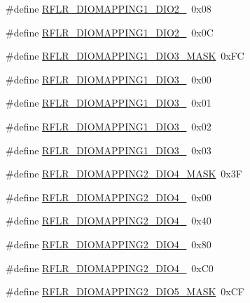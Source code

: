 \begin{DoxyCompactItemize}
\item 
\#define \mbox{\hyperlink{sx1276_regs-_lo_ra_8h_a9b1a690269c769c7a7eec3b20238868a}{R\+F\+L\+R\+\_\+\+D\+I\+O\+M\+A\+P\+P\+I\+N\+G1\+\_\+\+D\+I\+O2\+\_}}~0x08
\item 
\#define \mbox{\hyperlink{sx1276_regs-_lo_ra_8h_a2c4eeeb8117d63b3e7caf7c7d664aad0}{R\+F\+L\+R\+\_\+\+D\+I\+O\+M\+A\+P\+P\+I\+N\+G1\+\_\+\+D\+I\+O2\+\_}}~0x0C
\item 
\#define \mbox{\hyperlink{sx1276_regs-_lo_ra_8h_a671275ba8790f890b2cab8745c0e5da9}{R\+F\+L\+R\+\_\+\+D\+I\+O\+M\+A\+P\+P\+I\+N\+G1\+\_\+\+D\+I\+O3\+\_\+\+M\+A\+SK}}~0x\+FC
\item 
\#define \mbox{\hyperlink{sx1276_regs-_lo_ra_8h_a551ae1e5f5fca17d8b1866ef33d8c625}{R\+F\+L\+R\+\_\+\+D\+I\+O\+M\+A\+P\+P\+I\+N\+G1\+\_\+\+D\+I\+O3\+\_}}~0x00
\item 
\#define \mbox{\hyperlink{sx1276_regs-_lo_ra_8h_a2017ab5d8218e6ec01f7bc8c530dab36}{R\+F\+L\+R\+\_\+\+D\+I\+O\+M\+A\+P\+P\+I\+N\+G1\+\_\+\+D\+I\+O3\+\_}}~0x01
\item 
\#define \mbox{\hyperlink{sx1276_regs-_lo_ra_8h_ad8f51698cfb8f6f58a6f29735d27807b}{R\+F\+L\+R\+\_\+\+D\+I\+O\+M\+A\+P\+P\+I\+N\+G1\+\_\+\+D\+I\+O3\+\_}}~0x02
\item 
\#define \mbox{\hyperlink{sx1276_regs-_lo_ra_8h_abfb68e4b1ca125be4fa873f9bc2a4a35}{R\+F\+L\+R\+\_\+\+D\+I\+O\+M\+A\+P\+P\+I\+N\+G1\+\_\+\+D\+I\+O3\+\_}}~0x03
\item 
\#define \mbox{\hyperlink{sx1276_regs-_lo_ra_8h_a2edc9ee9a9806b51ce98036d53023a1b}{R\+F\+L\+R\+\_\+\+D\+I\+O\+M\+A\+P\+P\+I\+N\+G2\+\_\+\+D\+I\+O4\+\_\+\+M\+A\+SK}}~0x3F
\item 
\#define \mbox{\hyperlink{sx1276_regs-_lo_ra_8h_a4411dcaba5455b537f266a64720f27ed}{R\+F\+L\+R\+\_\+\+D\+I\+O\+M\+A\+P\+P\+I\+N\+G2\+\_\+\+D\+I\+O4\+\_}}~0x00
\item 
\#define \mbox{\hyperlink{sx1276_regs-_lo_ra_8h_a1bd8087999e9680a935e194cc38d0059}{R\+F\+L\+R\+\_\+\+D\+I\+O\+M\+A\+P\+P\+I\+N\+G2\+\_\+\+D\+I\+O4\+\_}}~0x40
\item 
\#define \mbox{\hyperlink{sx1276_regs-_lo_ra_8h_a236e237046e0ad2df6fc1863faf889e8}{R\+F\+L\+R\+\_\+\+D\+I\+O\+M\+A\+P\+P\+I\+N\+G2\+\_\+\+D\+I\+O4\+\_}}~0x80
\item 
\#define \mbox{\hyperlink{sx1276_regs-_lo_ra_8h_a34a1f33c5dc2b5ccfbb23eb88449e0c4}{R\+F\+L\+R\+\_\+\+D\+I\+O\+M\+A\+P\+P\+I\+N\+G2\+\_\+\+D\+I\+O4\+\_}}~0x\+C0
\item 
\#define \mbox{\hyperlink{sx1276_regs-_lo_ra_8h_af3fc23f7884695edc293589fd947e129}{R\+F\+L\+R\+\_\+\+D\+I\+O\+M\+A\+P\+P\+I\+N\+G2\+\_\+\+D\+I\+O5\+\_\+\+M\+A\+SK}}~0x\+CF

\end{DoxyCompactItemize}
